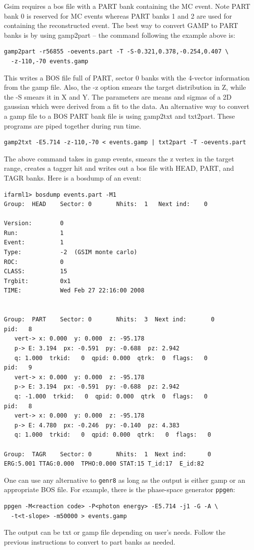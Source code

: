 Gsim requires a bos file with a PART bank containing the MC event. Note PART bank 0 is reserved for MC events whereas PART banks 1 and 2 are used for containing the reconstructed event. The best way to convert GAMP to PART banks is by using gamp2part -- the command following the example above is:
\begin{verbatim}
gamp2part -r56855 -oevents.part -T -S-0.321,0.378,-0.254,0.407 \
  -z-110,-70 events.gamp
\end{verbatim}
This writes a BOS file full of PART, sector 0 banks with the 4-vector information from the gamp file. Also, the -z option smears the target distribution in Z, while the -S smears it in X and Y. The parameters are means and sigmas of a 2D gaussian which were derived from a fit to the data. An alternative way to convert a gamp file to a BOS PART bank file is using gamp2txt and txt2part. These programs are piped together during run time.
\begin{verbatim}
gamp2txt -E5.714 -z-110,-70 < events.gamp | txt2part -T -oevents.part
\end{verbatim}
The above command takes in gamp events, smears the z vertex in the target range, creates a tagger hit and writes out a bos file with HEAD, PART, and TAGR banks. Here is a bosdump of an event:
\begin{verbatim}
ifarml1> bosdump events.part -M1
Group:  HEAD    Sector: 0       Nhits:  1   Next ind:    0

Version:        0
Run:            1
Event:          1
Type:           -2  (GSIM monte carlo)
ROC:            0
CLASS:          15
Trgbit:         0x1
TIME:           Wed Feb 27 22:16:00 2008


Group:  PART    Sector: 0       Nhits:  3  Next ind:       0
pid:   8
   vert-> x: 0.000  y: 0.000  z: -95.178
   p-> E: 3.194  px: -0.591  py: -0.688  pz: 2.942
   q: 1.000  trkid:   0  qpid: 0.000  qtrk:  0  flags:   0
pid:   9
   vert-> x: 0.000  y: 0.000  z: -95.178
   p-> E: 3.194  px: -0.591  py: -0.688  pz: 2.942
   q: -1.000  trkid:   0  qpid: 0.000  qtrk  0  flags:   0
pid:   8
   vert-> x: 0.000  y: 0.000  z: -95.178
   p-> E: 4.780  px: -0.246  py: -0.140  pz: 4.383
   q: 1.000  trkid:   0  qpid: 0.000  qtrk:   0  flags:   0

Group:  TAGR    Sector: 0       Nhits:  1  Next ind:      0
ERG:5.001 TTAG:0.000  TPHO:0.000 STAT:15 T_id:17  E_id:82
\end{verbatim}

One can use any alternative to \texttt{genr8} as long as the output is either gamp or an appropriate BOS file. For example, there is the phase-space generator \texttt{ppgen}:
\begin{verbatim}
ppgen -M<reaction code> -P<photon energy> -E5.714 -j1 -G -A \
  -t<t-slope> -m50000 > events.gamp
\end{verbatim}
The output can be txt or gamp file depending on user's needs. Follow the previous instructions to convert to part banks as needed.

